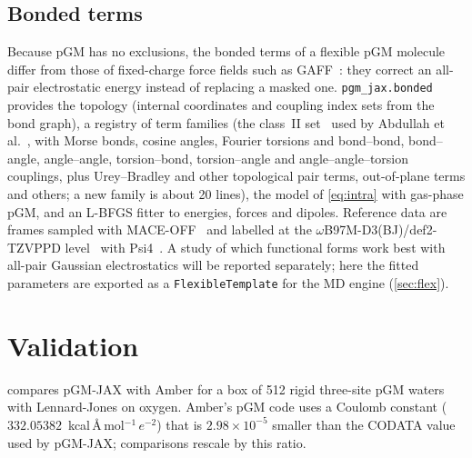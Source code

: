 \documentclass[11pt]{article}
\newcommand{\code}[1]{\texttt{#1}}
\begin{document}
\subsection{Bonded terms}\label{sec:bonded}
Because pGM has no exclusions, the bonded terms of a flexible pGM molecule differ from those of
fixed-charge force fields such as GAFF~\cite{wang2004gaff}: they correct an all-pair electrostatic
energy instead of replacing a masked one. \code{pgm\_jax.bonded} provides the topology (internal
coordinates and coupling index sets from the bond graph), a registry of term families (the class~II
set~\cite{dauberosguthorpe2019} used by Abdullah et al.~\cite{abdullah2025bonded}, with Morse bonds, cosine
angles, Fourier torsions and bond--bond, bond--angle, angle--angle, torsion--bond, torsion--angle
and angle--angle--torsion couplings, plus Urey--Bradley and other topological pair terms,
out-of-plane terms and others; a new family is about 20 lines), the model of \cref{eq:intra} with
gas-phase pGM, and an L-BFGS fitter to energies, forces and dipoles. Reference data are frames
sampled with MACE-OFF~\cite{kovacs2025maceoff} and labelled at the
$\omega$B97M-D3(BJ)/def2-TZVPPD level~\cite{mardirossian2016wb97mv,najibi2018wb97md3bj,grimme2011d3bj,rappoport2010def2}
with Psi4~\cite{smith2020psi4}. A study of which functional forms work best with all-pair Gaussian
electrostatics will be reported separately; here the fitted parameters are exported as a
\code{FlexibleTemplate} for the MD engine (\cref{sec:flex}).

\section{Validation}\label{sec:validation}

 compares pGM-JAX with Amber for a box of 512 rigid three-site pGM waters
with Lennard-Jones on oxygen. Amber's pGM code uses a Coulomb constant
($332.05382$~kcal\,\AA\,mol$^{-1}$\,$e^{-2}$) that is $2.98\times10^{-5}$ smaller than the CODATA
value used by pGM-JAX; comparisons rescale by this ratio.
\end{document}
